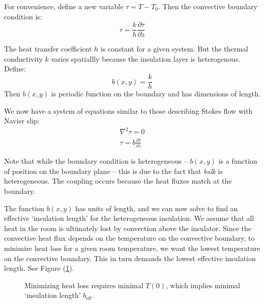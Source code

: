 \documentclass[12pt, a4paper, twoside, openright]{book}
\newcommand{\beff}{\ensuremath{b_{\mathrm{eff}}}}
\newcommand{\Tr}{\ensuremath{T_{\mathrm{room}}}}
\begin{document}
For convenience, define a new variable $ \tau = T - T_0$.  Then the convective boundary condition is:
\begin{equation}
\tau = \frac{k}{h} \frac{\partial \tau}{\partial z}
\end{equation}

The heat transfer coefficient $h$ is constant for a given system.  But the thermal conductivity $k$ varies spatiallly because the insulation layer is heterogenous.   Define:
\begin{equation}
b(x,y) = \frac{k}{h}
\end{equation}
Then $b(x,y)$ is periodic function on the boundary and has dimensions of length.

We now have a system of equations similar to those describing Stokes flow with Navier slip:
\begin{gather}
\nabla^2 \tau = 0 \\
\tau = b \frac{\partial \tau}{\partial z}
\end{gather}

Note that while the boundary condition is heterogeneous -- $b(x,y)$ is a function of position on the boundary plane -- this is due to the fact that \emph{bulk} is heterogeneous.  The coupling occurs because the heat fluxes match at the boundary.

The function $b(x,y)$ has units of length, and we can now solve to find an effective `insulation length' for the heterogeneous insulation.
We assume that all heat in the room is ultimately lost by convection above the insulator.  Since the convective heat flux depends on the temperature on the convective boundary,
  to minimize heat loss for a given room temperature, we want the lowest temperature on the convective boundary.  This in turn demands the lowest effective insulation length.  See Figure (\ref{insulationlength}).

\clearpage

\begin{figure}[ht]
\centering
{}
\caption{Minimizing heat loss requires minimal $T(0)$, which implies minimal `insulation length' $\beff$.}\label{insulationlength}
\end{figure}
\end{document}
